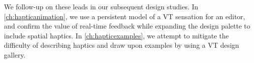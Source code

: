 We follow-up on these leads in our subsequent design studies.
In \autoref{ch:hapticanimation}, we use a persistent model of a VT sensation for an editor, and confirm the value of real-time feedback while expanding the design palette to include spatial haptics.
In \autoref{ch:hapticexamples}, we attempt to mitigate the difficulty of describing haptics and draw upon examples by using a VT design gallery.





%
%

